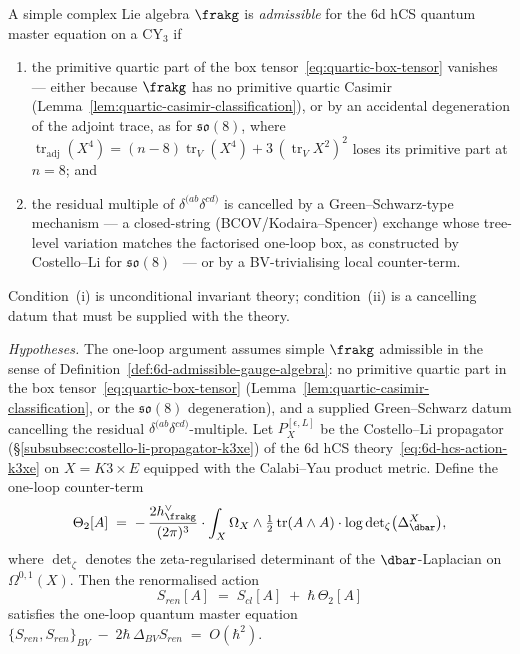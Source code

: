 \begin{definition}
\label{def:6d-admissible-gauge-algebra}
A simple complex Lie algebra $\frakg$ is \emph{admissible} for the
$6$d hCS quantum master equation on a CY$_3$ if
\begin{enumerate}[label=\textup{(\roman*)}]
\item the primitive quartic part of the box
tensor~\eqref{eq:quartic-box-tensor} vanishes --- either because
$\frakg$ has no primitive quartic Casimir
(Lemma~\ref{lem:quartic-casimir-classification}), or by an
accidental degeneration of the adjoint trace, as for
$\mathfrak{so}(8)$, where
$\operatorname{tr}_{\mathrm{adj}}(X^4)
= (n - 8)\operatorname{tr}_{V}(X^4)
+ 3\,(\operatorname{tr}_{V} X^2)^2$
loses its primitive part at $n = 8$; and
\item the residual multiple of $\delta^{(ab}\delta^{cd)}$ is
cancelled by a Green--Schwarz-type mechanism --- a closed-string
(BCOV/Kodaira--Spencer) exchange whose tree-level variation matches
the factorised one-loop box, as constructed by Costello--Li for
$\mathfrak{so}(8)$~\cite{CostelloLi2019} --- or by a BV-trivialising
local counter-term.
\end{enumerate}
Condition~(i) is unconditional invariant theory; condition~(ii) is a
cancelling datum that must be supplied with the theory.
\end{definition}

\begin{theorem}
\label{thm:6d-hcs-qme-one-loop-k3xe}
\noindent\emph{Hypotheses.} The one-loop argument assumes simple
$\frakg$ admissible in the sense of
Definition~\ref{def:6d-admissible-gauge-algebra}: no primitive
quartic part in the box tensor~\eqref{eq:quartic-box-tensor}
\textup{(}Lemma~\ref{lem:quartic-casimir-classification}, or the
$\mathfrak{so}(8)$ degeneration\textup{)}, and a supplied
Green--Schwarz datum cancelling the residual
$\delta^{(ab}\delta^{cd)}$-multiple.
Let $P_X^{[\epsilon, L]}$ be the Costello--Li propagator
\textup{(\S\ref{subsubsec:costello-li-propagator-k3xe})} of the $6$d hCS
theory~\eqref{eq:6d-hcs-action-k3xe} on $X = K3 \times E$ equipped with
the Calabi--Yau product metric. Define the one-loop counter-term
\begin{equation}
\label{eq:6d-hcs-counterterm-quadratic}
 \Theta_2[A] \;=\; -\, \frac{2 h^\vee_\frakg}{(2 \pi)^3} \cdot \int_X \Omega_X \wedge \tfrac{1}{2} \operatorname{tr}(A \wedge A) \cdot
 \log \det\!{}_\zeta\bigl(\Delta_{\dbar}^X\bigr),
\end{equation}
where $\det_\zeta$ denotes the zeta-regularised determinant of the
$\dbar$-Laplacian on $\Omega^{0,1}(X)$. Then the renormalised action
\[
 S_{ren}[A] \;=\; S_{cl}[A] \;+\; \hbar\, \Theta_2[A]
\]
satisfies the one-loop quantum master equation
$\{S_{ren}, S_{ren}\}_{BV} \;-\; 2 \hbar\, \Delta_{BV} S_{ren} \;=\; O(\hbar^2)$.
\end{theorem}

